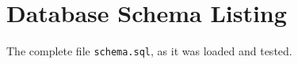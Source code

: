\appendix
\chapter{Database Schema Listing}
The complete file \texttt{schema.sql}, as it was loaded and tested.
{\lstset{basicstyle=\ttfamily\tiny,language=SQL}
}
